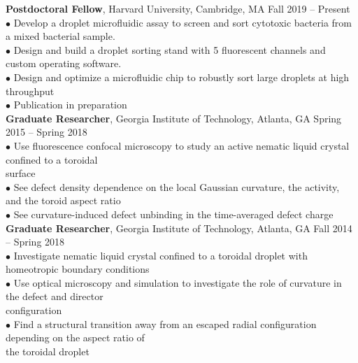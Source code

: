 \documentclass[10pt]{article}
\begin{document}
{\bf Postdoctoral Fellow}, Harvard University, Cambridge, MA \hfill Fall 2019 -- Present\\
\hspace*{10pt}$\bullet$ Develop a droplet microfluidic assay to screen and sort cytotoxic bacteria from a mixed bacterial sample.\\
\hspace*{10pt}$\bullet$ Design and build a droplet sorting stand with 5 fluorescent channels and custom operating software.\\
\hspace*{10pt}$\bullet$ Design and optimize a microfluidic chip to robustly sort large droplets at high throughput\\
\hspace*{10pt}$\bullet$ Publication in preparation\\

{\bf Graduate Researcher}, Georgia Institute of Technology, Atlanta, GA \hfill Spring 2015 -- Spring 2018\\
\hspace*{10pt}$\bullet$ Use fluorescence confocal microscopy to study an active nematic liquid crystal confined to a toroidal\\ \hspace*{15pt} surface\\
\hspace*{10pt}$\bullet$ See defect density dependence on the local Gaussian curvature, the activity, and the toroid aspect ratio\\
\hspace*{10pt}$\bullet$ See curvature-induced defect unbinding in the time-averaged defect charge\\

{\bf Graduate Researcher}, Georgia Institute of Technology, Atlanta, GA \hfill Fall 2014 -- Spring 2018\\
\hspace*{10pt}$\bullet$ Investigate nematic liquid crystal confined to a toroidal droplet with homeotropic boundary conditions\\
\hspace*{10pt}$\bullet$ Use optical microscopy and simulation to investigate the role of curvature in the defect and director\\ \hspace*{15pt} configuration\\
\hspace*{10pt}$\bullet$ Find a structural transition away from an escaped radial configuration depending on the aspect ratio of\\ \hspace*{15pt} the toroidal droplet\\
\end{document}
